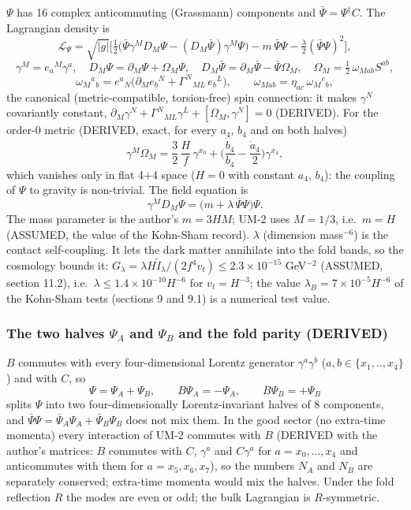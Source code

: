 \documentclass[
  10pt,
]{article}
\begin{document}
\(\Psi\) has 16 complex anticommuting (Grassmann) components and
\(\bar\Psi = \Psi^\dagger C\). The Lagrangian density is
\[ \mathcal L_\Psi = \sqrt{|g|}\Big[\tfrac12\big(\bar\Psi\gamma^M D_M\Psi - (D_M\bar\Psi)\gamma^M\Psi\big) - m\,\bar\Psi\Psi - \tfrac{\lambda}{2}(\bar\Psi\Psi)^2\Big], \]
\[ \gamma^M = e_a{}^M\gamma^a,\quad D_M\Psi = \partial_M\Psi + \Omega_M\Psi,\quad D_M\bar\Psi = \partial_M\bar\Psi - \bar\Psi\Omega_M,\quad
   \Omega_M = \tfrac12\,\omega_{Mab}S^{ab}, \]
\[ \omega_M{}^a{}_b = e^a{}_N\big(\partial_M e_b{}^N + \Gamma^N{}_{ML}\,e_b{}^L\big),\qquad \omega_{Mab} = \eta_{ac}\,\omega_M{}^c{}_b , \]
the canonical (metric-compatible, torsion-free) spin connection: it
makes \(\gamma^N\) covariantly constant,
\(\partial_M\gamma^N + \Gamma^N{}_{ML}\gamma^L + [\Omega_M, \gamma^N] = 0\)
(DERIVED). For the order-0 metric (DERIVED, exact, for every \(a_4\),
\(b_4\) and on both halves)
\[ \gamma^M\Omega_M = \frac{3}{2}\,\frac{H}{f}\,\gamma^{x_0} + \Big(\frac{\dot b_4}{b_4} - \frac{\dot a_4}{2}\Big)\gamma^{x_4} ,\]
which vanishes only in flat 4+4 space (\(H = 0\) with constant \(a_4\),
\(b_4\)): the coupling of \(\Psi\) to gravity is non-trivial. The field
equation is
\[ \gamma^M D_M\Psi = \big(m + \lambda\,\bar\Psi\Psi\big)\Psi . \] The
mass parameter is the author's \(m = 3HM\); UM-2 uses \(M = 1/3\),
i.e.~\(m = H\) (ASSUMED, the value of the Kohn-Sham record). \(\lambda\)
(dimension mass\(^{-6}\)) is the contact self-coupling. It lets the dark
matter annihilate into the fold bands, so the cosmology bounds it:
\(G_\lambda = \lambda H\tilde I_\lambda/(2f^4v_t) \le 2.3\times10^{-15}\)
GeV\(^{-2}\) (ASSUMED, section 11.2),
i.e.~\(\lambda \le 1.4\times10^{-10}H^{-6}\) for \(v_t = H^{-3}\); the
value \(\lambda_B = 7\times10^{-5}H^{-6}\) of the Kohn-Sham tests
(sections 9 and 9.1) is a numerical test value.

\hypertarget{the-two-halves-psi_a-and-psi_b-and-the-fold-parity-derived}{%
\subsubsection{\texorpdfstring{The two halves \(\Psi_A\) and \(\Psi_B\)
and the fold parity
(DERIVED)}{The two halves \textbackslash Psi\_A and \textbackslash Psi\_B and the fold parity (DERIVED)}}\label{the-two-halves-psi_a-and-psi_b-and-the-fold-parity-derived}}

\(B\) commutes with every four-dimensional Lorentz generator
\(\gamma^a\gamma^b\) (\(a, b \in \{x_1, .., x_4\}\)) and with \(C\), so
\[ \Psi = \Psi_A + \Psi_B, \qquad B\Psi_A = -\Psi_A, \qquad B\Psi_B = +\Psi_B \]
splits \(\Psi\) into two four-dimensionally Lorentz-invariant halves of
8 components, and \(\bar\Psi\Psi = \bar\Psi_A\Psi_A + \bar\Psi_B\Psi_B\)
does not mix them. In the good sector (no extra-time momenta) every
interaction of UM-2 commutes with \(B\) (DERIVED with the author's
matrices: \(B\) commutes with \(C\), \(\gamma^a\) and \(C\gamma^a\) for
\(a = x_0, \dots, x_4\) and anticommutes with them for
\(a = x_5, x_6, x_7\)), so the numbers \(N_A\) and \(N_B\) are
separately conserved; extra-time momenta would mix the halves. Under the
fold reflection \(R\) the modes are even or odd; the bulk Lagrangian is
\(R\)-symmetric.
\end{document}
